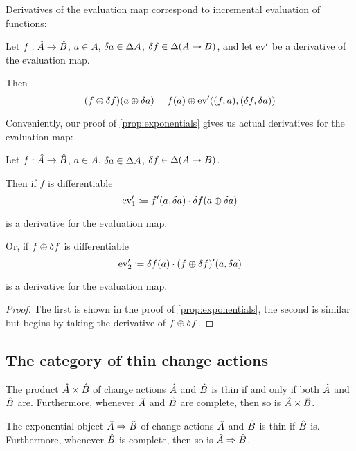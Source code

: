 Derivatives of the evaluation map correspond to incremental evaluation of functions:

\begin{prop}[Incrementalization]
\label{prop:incrementalization}
  Let $f: \hat{A} \rightarrow \hat{B}$, $a \in A$, $\delta a \in
  \Delta A$, $\delta f \in \Delta (A \rightarrow B)$, and let
  $\operatorname{ev}'$ be a derivative of the evaluation map.

  Then 
  $$(f \oplus \delta f)(a \oplus \delta a) = f(a) \oplus \operatorname{ev}'((f, a), (\delta f, \delta a))$$
\end{prop}

Conveniently, our proof of \cref{prop:exponentials} gives us actual derivatives for the evaluation map:

\begin{prop}
\label{prop:evDerivatives}
  Let $f: \hat{A} \rightarrow \hat{B}$, $a \in A$, $\delta a \in
  \Delta A$, $\delta f \in \Delta (A \rightarrow B)$.

  Then if $f$ is differentiable
  $$\operatorname{ev}'_1 \coloneqq f'(a, \delta a) \cdot \delta f(a \oplus \delta a)$$

  is a derivative for the evaluation map.
  
  Or, if $f \oplus \delta f$ is differentiable
  $$\operatorname{ev}'_2 \coloneqq \delta f(a) \cdot (f \oplus \delta f)'(a, \delta a)$$

  is a derivative for the evaluation map.
\end{prop}
\ifproofs
\begin{proof}
  The first is shown in the proof of \cref{prop:exponentials}, the second is
  similar but begins by taking the derivative of $f \oplus \delta f$.
\end{proof}
\fi

\subsection{The category of thin change actions}

\begin{prop}
  The product $\hat{A} \times \hat{B}$ of change actions $\hat{A}$ and $\hat{B}$ is thin if and only if both $\hat{A}$ and $\hat{B}$ are.
  Furthermore, whenever $\hat{A}$ and $\hat{B}$ are complete, then so is $\hat{A} \times \hat{B}$.

  The exponential object $\hat{A} \Rightarrow \hat{B}$ of change actions $\hat{A}$ and $\hat{B}$ is thin if $\hat{B}$ is. 
  Furthermore, whenever $\hat{B}$ is complete, then so is $\hat{A} \Rightarrow \hat{B}$.
\end{prop}


